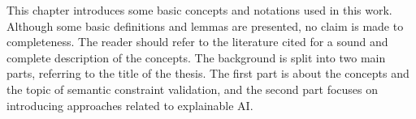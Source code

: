 This chapter introduces some basic concepts and notations used in this work. Although some basic definitions and lemmas are presented, no claim is made to completeness. The reader should refer to the literature cited for a sound and complete description of the concepts. The background is split into two main parts, referring to the title of the thesis. The first part is about the concepts and the topic of semantic constraint validation, and the second part focuses on introducing approaches related to explainable AI.
